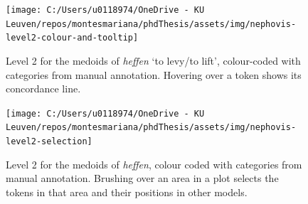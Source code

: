 \documentclass[
]{book}
\begin{document}
\begin{figure}
\texttt{[image: C:/Users/u0118974/OneDrive - KU Leuven/repos/montesmariana/phdThesis/assets/img/nephovis-level2-colour-and-tooltip]} \caption{Level 2 for the medoids of \emph{heffen} `to levy/to lift', colour-coded with categories from manual annotation. Hovering over a token shows its concordance line.}\label{fig:nepho2-colour}
\end{figure}



\begin{figure}
\texttt{[image: C:/Users/u0118974/OneDrive - KU Leuven/repos/montesmariana/phdThesis/assets/img/nephovis-level2-selection]} \caption{Level 2 for the medoids of \emph{heffen}, colour coded with categories from manual annotation. Brushing over an area in a plot selects the tokens in that area and their positions in other models.}\label{fig:nepho2-selection}
\end{figure}
\end{document}
